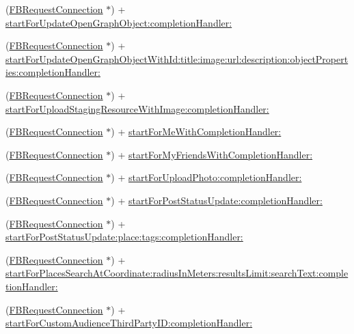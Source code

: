 \begin{DoxyCompactItemize}
\item 
(\hyperlink{interfaceFBRequestConnection}{F\+B\+Request\+Connection} $\ast$) + \hyperlink{interfaceFBRequestConnection_a481c4621f12410a7f6bbc7a0ccd6890b}{start\+For\+Update\+Open\+Graph\+Object\+:completion\+Handler\+:}
\item 
(\hyperlink{interfaceFBRequestConnection}{F\+B\+Request\+Connection} $\ast$) + \hyperlink{interfaceFBRequestConnection_ab5cf9ca8b5ab176a3d46fdf8db08ddf8}{start\+For\+Update\+Open\+Graph\+Object\+With\+Id\+:title\+:image\+:url\+:description\+:object\+Properties\+:completion\+Handler\+:}
\item 
(\hyperlink{interfaceFBRequestConnection}{F\+B\+Request\+Connection} $\ast$) + \hyperlink{interfaceFBRequestConnection_a930bc2fc6bfff73c3d98d15e6c84a5f9}{start\+For\+Upload\+Staging\+Resource\+With\+Image\+:completion\+Handler\+:}
\item 
(\hyperlink{interfaceFBRequestConnection}{F\+B\+Request\+Connection} $\ast$) + \hyperlink{interfaceFBRequestConnection_a9d89090f947eacfdf441172f842f5bc8}{start\+For\+Me\+With\+Completion\+Handler\+:}
\item 
(\hyperlink{interfaceFBRequestConnection}{F\+B\+Request\+Connection} $\ast$) + \hyperlink{interfaceFBRequestConnection_a1eeb9942474312db3197be0fa569bc60}{start\+For\+My\+Friends\+With\+Completion\+Handler\+:}
\item 
(\hyperlink{interfaceFBRequestConnection}{F\+B\+Request\+Connection} $\ast$) + \hyperlink{interfaceFBRequestConnection_a824e16e083537312be6d59c8bece3f0e}{start\+For\+Upload\+Photo\+:completion\+Handler\+:}
\item 
(\hyperlink{interfaceFBRequestConnection}{F\+B\+Request\+Connection} $\ast$) + \hyperlink{interfaceFBRequestConnection_a0dee12879e90db0c29e15916375c73b0}{start\+For\+Post\+Status\+Update\+:completion\+Handler\+:}
\item 
(\hyperlink{interfaceFBRequestConnection}{F\+B\+Request\+Connection} $\ast$) + \hyperlink{interfaceFBRequestConnection_a98c2c8abc0efadda28f1c21ec0878a05}{start\+For\+Post\+Status\+Update\+:place\+:tags\+:completion\+Handler\+:}
\item 
(\hyperlink{interfaceFBRequestConnection}{F\+B\+Request\+Connection} $\ast$) + \hyperlink{interfaceFBRequestConnection_abc6f5878bcfabf0b419347a4cbfb2f68}{start\+For\+Places\+Search\+At\+Coordinate\+:radius\+In\+Meters\+:results\+Limit\+:search\+Text\+:completion\+Handler\+:}
\item 
(\hyperlink{interfaceFBRequestConnection}{F\+B\+Request\+Connection} $\ast$) + \hyperlink{interfaceFBRequestConnection_ab2ed1b7d417b4c723b37512870a5add9}{start\+For\+Custom\+Audience\+Third\+Party\+I\+D\+:completion\+Handler\+:}

\end{DoxyCompactItemize}

